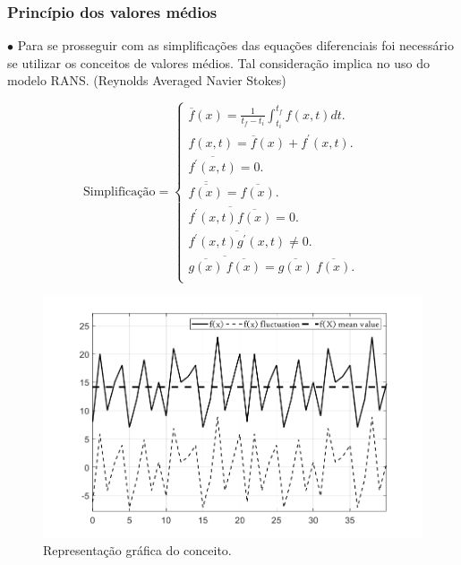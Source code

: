 \documentclass[xcolor=dvipsnames,10pt,aspectratio=169]{beamer}
\begin{document}
		
		
		\begin{frame}
			\frametitle{Princípio dos valores médios}
			$\bullet$ Para se prosseguir com as simplificações das equações diferenciais foi necessário se utilizar os conceitos de valores médios. Tal consideração implica no uso do modelo RANS. (Reynolds Averaged Navier Stokes)
			\\
			\begin{minipage}[h!]{0.45\textwidth}
				\begin{equation*}
				\label{ola}
				\text{Simplificação}=
				\begin{cases}
				\overline{f}({x})=\frac{1}{t_f - t_i} \int_{t_i}^{t_f} f({x} , t) dt.      & \quad  \\
				f({x} , t) = \overline{f}({x}) + f^\prime ({x} ,t) . & \quad   \\
				\overline{f^\prime ({x} ,t)} = 0 . & \quad   \\
				\overline{\overline{f({x})}} = \overline{f({x})} . & \quad   \\
				\overline{f^\prime ({x} ,t)\overline{f({x})}} = 0 .& \quad   \\
				\overline{f^\prime ({x} ,t)g^\prime ({x} ,t)} \neq 0 . & \quad   \\
				\overline{  \overline{g({x})} \ \overline{f({x})}  } = {\overline{g({x})}} \ {\overline{f({x})}} . & \quad   \\
				\end{cases}
				\end{equation*}
			\end{minipage}\hfill
			\begin{minipage}[h!]{0.45\textwidth}
				\begin{figure}
					\centering
					\includegraphics[angle=0, scale=0.3]{medios}
					\caption{Representação gráfica do conceito.}
					\label{medios}
				\end{figure}
			\end{minipage}
	     	\\
		\end{frame}
	
\end{document}

